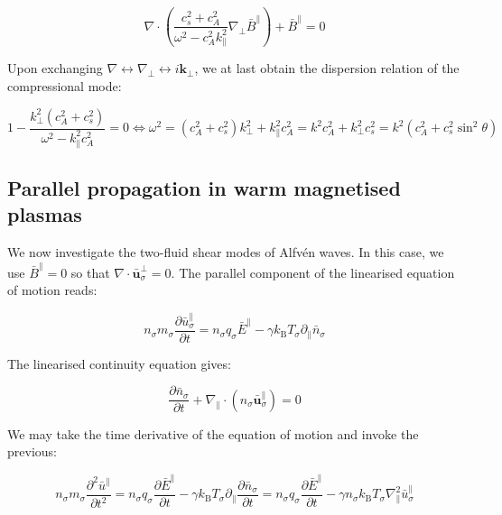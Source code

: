\begin{equation}
    \nabla\cdot\left(\frac{c_s^2+c_A^2}{\omega^2-c_A^2k_\parallel^2}\nabla_\perp\bar{B}^\parallel\right)+\bar{B}^\parallel=0
\end{equation}

Upon exchanging $\nabla\leftrightarrow\nabla_\perp\leftrightarrow i\mathbf{k}_\perp$, we at last obtain the dispersion relation of the compressional mode:

\begin{equation}
    1-\frac{k_\perp^2(c_A^2+c_s^2)}{\omega^2-k_\parallel^2 c_A^2}=0\Longleftrightarrow\omega^2=(c_A^2+c_s^2)k_\perp^2+k_\parallel^2c_A^2=k^2c_A^2+k_\perp^2c_s^2=k^2(c_A^2+c_s^2\sin^2{\theta})
\end{equation}

\subsection{Parallel propagation in warm magnetised plasmas}

We now investigate the two-fluid shear modes of Alfvén waves. In this case, we use $\bar{B}^\parallel=0$ so that $\nabla\cdot\bar{\mathbf{u}}_\sigma^\perp=0$. The parallel component of the linearised equation of motion reads:

\begin{equation}
    n_\sigma  m_\sigma\frac{\partial\bar{u}_\sigma^\parallel}{\partial t}=n_\sigma q_\sigma\bar{E}^\parallel-\gamma k_\mathrm{B}T_\sigma\partial_\parallel\bar{n}_\sigma
\end{equation}

The linearised continuity equation gives:

\begin{equation}
    \frac{\partial\bar{n}_\sigma}{\partial t}+\nabla_\parallel\cdot(n_\sigma\bar{\mathbf{u}}_\sigma^\parallel)=0
\end{equation}

We may take the time derivative of the equation of motion and invoke the previous:

\begin{equation}
    n_\sigma m_\sigma\frac{\partial^2\bar{u}^\parallel}{\partial t^2}=n_\sigma q_\sigma\frac{\partial\bar{E}^\parallel}{\partial t}-\gamma k_\mathrm{B}T_\sigma\partial_\parallel\frac{\partial\bar{n}_\sigma}{\partial t}=n_\sigma q_\sigma\frac{\partial\bar{E}^\parallel}{\partial t}-\gamma n_\sigma k_\mathrm{B}T_\sigma\nabla_\parallel^2\bar{u}_\sigma^\parallel
\end{equation}


